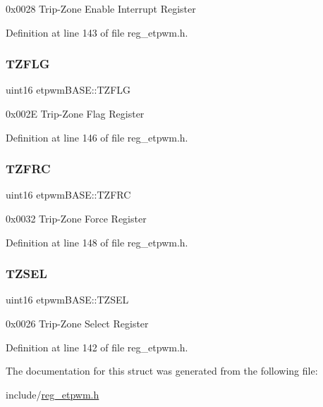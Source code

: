 0x0028 Trip-\/\+Zone Enable Interrupt Register 

Definition at line 143 of file reg\+\_\+etpwm.\+h.

\mbox{\label{structetpwmBASE_a5340173a2069e4e74a2c6099109284b3}} 
\subsubsection{\texorpdfstring{T\+Z\+F\+LG}{TZFLG}}
{\footnotesize\ttfamily uint16 etpwm\+B\+A\+S\+E\+::\+T\+Z\+F\+LG}

0x002E Trip-\/\+Zone Flag Register 

Definition at line 146 of file reg\+\_\+etpwm.\+h.

\mbox{\label{structetpwmBASE_a908e972df9bd8c2627974f1fe687e68a}} 
\subsubsection{\texorpdfstring{T\+Z\+F\+RC}{TZFRC}}
{\footnotesize\ttfamily uint16 etpwm\+B\+A\+S\+E\+::\+T\+Z\+F\+RC}

0x0032 Trip-\/\+Zone Force Register 

Definition at line 148 of file reg\+\_\+etpwm.\+h.

\mbox{\label{structetpwmBASE_a16ba0292c3192482468b4a173668b02a}} 
\subsubsection{\texorpdfstring{T\+Z\+S\+EL}{TZSEL}}
{\footnotesize\ttfamily uint16 etpwm\+B\+A\+S\+E\+::\+T\+Z\+S\+EL}

0x0026 Trip-\/\+Zone Select Register 

Definition at line 142 of file reg\+\_\+etpwm.\+h.



The documentation for this struct was generated from the following file\+:\begin{DoxyCompactItemize}
\item 
include/\mbox{\hyperlink{reg__etpwm_8h}{reg\+\_\+etpwm.\+h}}\end{DoxyCompactItemize}
